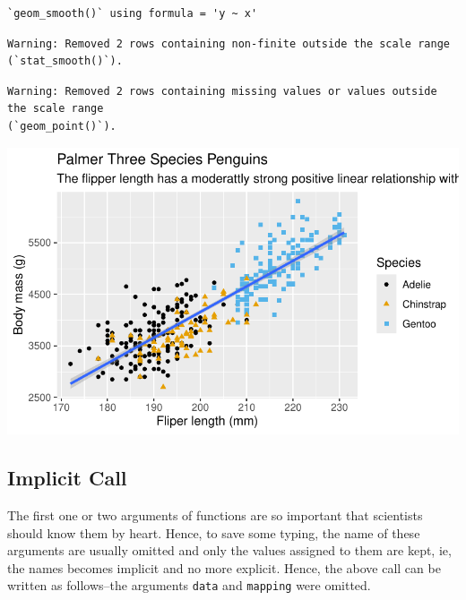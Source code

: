 \documentclass[
  letterpaper,
  DIV=11,
  numbers=noendperiod]{scrreprt}
\begin{document}
\begin{verbatim}
`geom_smooth()` using formula = 'y ~ x'
\end{verbatim}

\begin{verbatim}
Warning: Removed 2 rows containing non-finite outside the scale range
(`stat_smooth()`).
\end{verbatim}

\begin{verbatim}
Warning: Removed 2 rows containing missing values or values outside the scale range
(`geom_point()`).
\end{verbatim}

\includegraphics{src/r-for-data-science/01-data-viz_files/figure-pdf/unnamed-chunk-13-1.pdf}

\subsection{Implicit Call}\label{implicit-call}

The first one or two arguments of functions are so important that
scientists should know them by heart. Hence, to save some typing, the
name of these arguments are usually omitted and only the values assigned
to them are kept, ie, the names becomes implicit and no more explicit.
Hence, the above call can be written as follows--the arguments
\texttt{data} and \texttt{mapping} were omitted.
\end{document}
